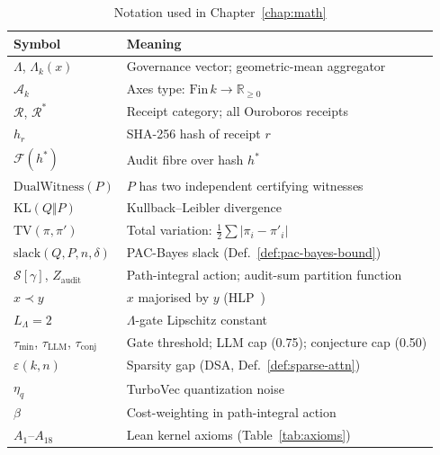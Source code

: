 \begin{table}[h!]
\centering\small
\caption{Notation used in Chapter~\ref{chap:math}}
\label{tab:notation}
\begin{tabular}{ll}
\hline
\textbf{Symbol} & \textbf{Meaning} \\
\hline
$\Lambda$, $\Lambda_k(x)$ & Governance vector; geometric-mean aggregator \\
$\mathcal{A}_k$ & Axes type: $\mathrm{Fin}\,k \to \mathbb{R}_{\ge 0}$ \\
$\mathcal{R}$, $\mathcal{R}^*$ & Receipt category; all Ouroboros receipts \\
$h_r$ & SHA-256 hash of receipt $r$ \\
$\mathcal{F}(h^*)$ & Audit fibre over hash $h^*$ \\
$\mathrm{DualWitness}(P)$ & $P$ has two independent certifying witnesses \\
$\mathrm{KL}(Q \Vert P)$ & Kullback--Leibler divergence~\cite{KL1951} \\
$\mathrm{TV}(\pi,\pi')$ & Total variation: $\tfrac{1}{2}\sum|\pi_i - \pi'_i|$ \\
$\mathrm{slack}(Q,P,n,\delta)$ & PAC-Bayes slack (Def.~\ref{def:pac-bayes-bound}) \\
$\mathcal{S}[\gamma]$, $Z_{\mathrm{audit}}$ & Path-integral action; audit-sum partition function \\
$x \prec y$ & $x$ majorised by $y$ (HLP~\cite{HLP1934}) \\
$L_\Lambda = 2$ & $\Lambda$-gate Lipschitz constant \\
$\tau_{\min}$, $\tau_{\mathrm{LLM}}$, $\tau_{\mathrm{conj}}$ & Gate threshold; LLM cap (0.75); conjecture cap (0.50) \\
$\varepsilon(k,n)$ & Sparsity gap (DSA, Def.~\ref{def:sparse-attn}) \\
$\eta_q$ & TurboVec quantization noise \\
$\beta$ & Cost-weighting in path-integral action \\
$A_1$--$A_{18}$ & Lean kernel axioms (Table~\ref{tab:axioms}) \\
\hline
\end{tabular}
\end{table}
